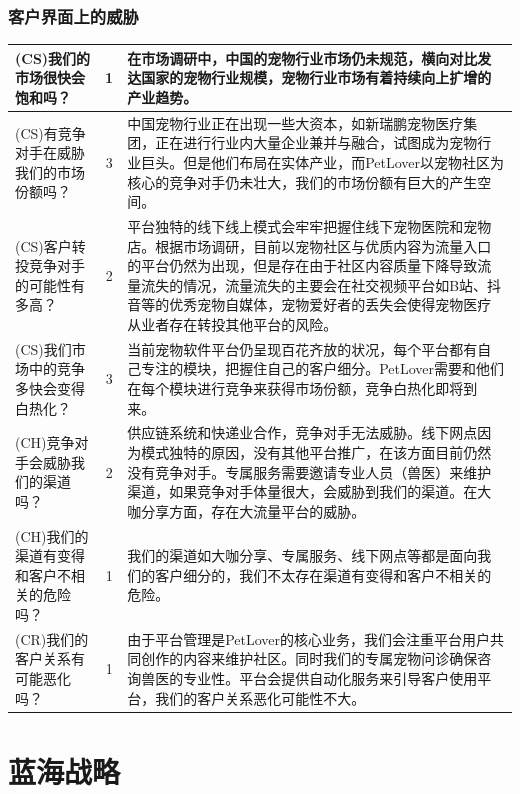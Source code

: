 \documentclass[a4paper]{ctexart}
\begin{document}
\FloatBarrier
\subsubsection{客户界面上的威胁}
\begin{table}[h]
  \centering
\begin{tabular}{|p{3.5cm}|c|p{10cm}|}
  \hline
  (CS)我们的市场很快会饱和吗？& 1 & 在市场调研中，中国的宠物行业市场仍未规范，横向对比发达国家的宠物行业规模，宠物行业市场有着持续向上扩增的产业趋势。\\
  \hline
  (CS)有竞争对手在威胁我们的市场份额吗？& 3 & 中国宠物行业正在出现一些大资本，如新瑞鹏宠物医疗集团，正在进行行业内大量企业兼并与融合，试图成为宠物行业巨头。但是他们布局在实体产业，而PetLover以宠物社区为核心的竞争对手仍未壮大，我们的市场份额有巨大的产生空间。\\
  \hline
  (CS)客户转投竞争对手的可能性有多高？& 2 & 平台独特的线下线上模式会牢牢把握住线下宠物医院和宠物店。根据市场调研，目前以宠物社区与优质内容为流量入口的平台仍然为出现，但是存在由于社区内容质量下降导致流量流失的情况，流量流失的主要会在社交视频平台如B站、抖音等的优秀宠物自媒体，宠物爱好者的丢失会使得宠物医疗从业者存在转投其他平台的风险。\\
  \hline
  (CS)我们市场中的竞争多快会变得白热化？& 3 & 当前宠物软件平台仍呈现百花齐放的状况，每个平台都有自己专注的模块，把握住自己的客户细分。PetLover需要和他们在每个模块进行竞争来获得市场份额，竞争白热化即将到来。\\
  \hline
  (CH)竞争对手会威胁我们的渠道吗？& 2 & 供应链系统和快递业合作，竞争对手无法威胁。线下网点因为模式独特的原因，没有其他平台推广，在该方面目前仍然没有竞争对手。专属服务需要邀请专业人员（兽医）来维护渠道，如果竞争对手体量很大，会威胁到我们的渠道。在大咖分享方面，存在大流量平台的威胁。\\
  \hline
  (CH)我们的渠道有变得和客户不相关的危险吗？& 1 & 我们的渠道如大咖分享、专属服务、线下网点等都是面向我们的客户细分的，我们不太存在渠道有变得和客户不相关的危险。\\
  \hline
  (CR)我们的客户关系有可能恶化吗？& 1 & 由于平台管理是PetLover的核心业务，我们会注重平台用户共同创作的内容来维护社区。同时我们的专属宠物问诊确保咨询兽医的专业性。平台会提供自动化服务来引导客户使用平台，我们的客户关系恶化可能性不大。\\
  \hline
\end{tabular}
\end{table}

\FloatBarrier
\section{蓝海战略}
\end{document}
